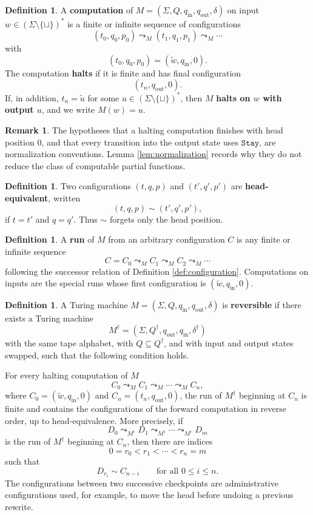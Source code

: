 \documentclass[12pt]{article}
\theoremstyle{plain}
\theoremstyle{definition}
\newtheorem{defn}[thm]{Definition}
\newtheorem{remark}[thm]{Remark}
\newcommand{\blank}{\sqcup}
\begin{document}
\begin{defn}\label{def:computation}
A \textbf{computation} of $M=(\Sigma,Q,q_{\mathrm{in}},q_{\mathrm{out}},\delta)$ on input $w\in(\Sigma\setminus\{\blank\})^\ast$ is a finite or infinite sequence of configurations
\[
(t_0,q_0,p_0)\leadsto_M(t_1,q_1,p_1)\leadsto_M\cdots
\]
with
\[
(t_0,q_0,p_0)=(\widetilde w,q_{\mathrm{in}},0).
\]
The computation \textbf{halts} if it is finite and has final configuration
\[
(t_n,q_{\mathrm{out}},0).
\]
If, in addition, $t_n=\widetilde u$ for some $u\in(\Sigma\setminus\{\blank\})^\ast$, then $M$ \textbf{halts on $w$ with output $u$}, and we write $M(w)=u$.
\end{defn}

\begin{remark}\label{rmk:normal-form}
The hypotheses that a halting computation finishes with head position $0$, and that every transition into the output state uses $\texttt{Stay}$, are normalization conventions. Lemma \ref{lem:normalization} records why they do not reduce the class of computable partial functions.
\end{remark}

\begin{defn}\label{def:head_equivalence}
Two configurations $(t,q,p)$ and $(t',q',p')$ are \textbf{head-equivalent}, written
\[
(t,q,p)\sim(t',q',p'),
\]
if $t=t'$ and $q=q'$. Thus $\sim$ forgets only the head position.
\end{defn}

\begin{defn}\label{def:run}
A \textbf{run} of $M$ from an arbitrary configuration $C$ is any finite or infinite sequence
\[
C=C_0\leadsto_M C_1\leadsto_M C_2\leadsto_M\cdots
\]
following the successor relation of Definition \ref{def:configuration}. Computations on inputs are the special runs whose first configuration is $(\widetilde w,q_{\mathrm{in}},0)$.
\end{defn}

\begin{defn}\label{def:reversible_machine}
A Turing machine $M=(\Sigma,Q,q_{\mathrm{in}},q_{\mathrm{out}},\delta)$ is \textbf{reversible} if there exists a Turing machine
\[
M^\dagger=(\Sigma,Q^\dagger,q_{\mathrm{out}},q_{\mathrm{in}},\delta^\dagger)
\]
with the same tape alphabet, with $Q\subseteq Q^\dagger$, and with input and output states swapped, such that the following condition holds.

For every halting computation of $M$
\[
C_0\leadsto_M C_1\leadsto_M\cdots\leadsto_M C_n,
\]
where $C_0=(\widetilde w,q_{\mathrm{in}},0)$ and $C_n=(t_n,q_{\mathrm{out}},0)$, the run of $M^\dagger$ beginning at $C_n$ is finite and contains the configurations of the forward computation in reverse order, up to head-equivalence. More precisely, if
\[
D_0\leadsto_{M^\dagger}D_1\leadsto_{M^\dagger}\cdots\leadsto_{M^\dagger}D_m
\]
is the run of $M^\dagger$ beginning at $C_n$, then there are indices
\[
0=r_0<r_1<\cdots<r_n=m
\]
such that
\[
D_{r_i}\sim C_{n-i}\qquad\text{for all }0\leq i\leq n.
\]
The configurations between two successive checkpoints are administrative configurations used, for example, to move the head before undoing a previous rewrite.
\end{defn}
\end{document}
